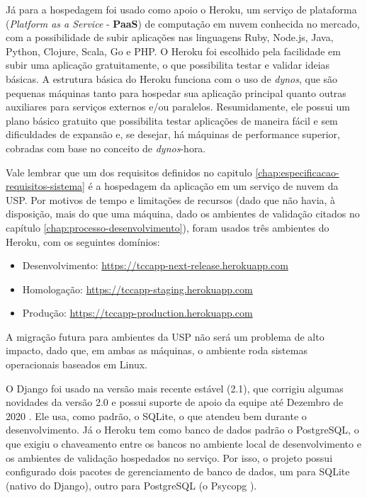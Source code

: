 Já para a hospedagem foi usado como apoio o Heroku, um serviço de plataforma (\textit{Platform as a Service} - \textbf{PaaS}) de computação em nuvem conhecida no mercado, com a possibilidade de subir aplicações nas linguagens Ruby, Node.js, Java, Python, Clojure, Scala, Go e PHP. O Heroku foi escolhido pela facilidade em subir uma aplicação gratuitamente, o que possibilita testar e validar ideias básicas. A estrutura básica do Heroku funciona com o uso de \textit{dynos}, que são pequenas máquinas tanto para hospedar sua aplicação principal quanto outras auxiliares para serviços externos e/ou paralelos. Resumidamente, ele possui um plano básico gratuito que possibilita testar aplicações de maneira fácil e sem dificuldades de expansão e, se desejar, há máquinas de performance superior, cobradas com base no conceito de \textit{dynos}-hora.

Vale lembrar que um dos requisitos definidos no capitulo \ref{chap:especificacao-requisitos-sistema} é a hospedagem da aplicação em um serviço de nuvem da USP. Por motivos de tempo e limitações de recursos (dado que não havia, à disposição, mais do que uma máquina, dado os ambientes de validação citados no capítulo \ref{chap:processo-desenvolvimento}), foram usados três ambientes do Heroku, com os seguintes domínios:

\begin{itemize}
    \item Desenvolvimento: \href{https://tccapp-next-release.herokuapp.com}{https://tccapp-next-release.herokuapp.com}
    \item Homologação: \href{https://tccapp-staging.herokuapp.com}{https://tccapp-staging.herokuapp.com}
    \item Produção: \href{https://tccapp-production.herokuapp.com}{https://tccapp-production.herokuapp.com}
\end{itemize}

A migração futura para ambientes da USP não será um problema de alto impacto, dado que, em ambas as máquinas, o ambiente roda sistemas operacionais baseados em Linux.

O Django foi usado na versão mais recente estável (2.1), que corrigiu algumas novidades da versão 2.0 e possui suporte de apoio da equipe até Dezembro de 2020 \cite{djangodownload}. Ele usa, como padrão, o SQLite, o que atendeu bem durante o desenvolvimento. Já o Heroku tem como banco de dados padrão o PostgreSQL, o que exigiu o chaveamento entre os bancos no ambiente local de desenvolvimento e os ambientes de validação hospedados no serviço. Por isso, o projeto possui configurado dois pacotes de gerenciamento de banco de dados, um para SQLite (nativo do Django), outro para PostgreSQL (o Psycopg \cite{lucassouto2017}).

